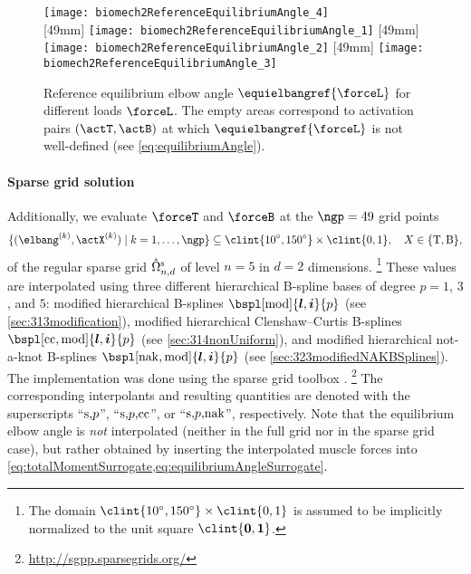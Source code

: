 \begin{figure}
  \texttt{[image: biomech2ReferenceEquilibriumAngle\_4]}%
  \\[2mm]%
  [49mm]{%
    \texttt{[image: biomech2ReferenceEquilibriumAngle\_1]}%
  }%
  \hfill%
  [49mm]{%
    \texttt{[image: biomech2ReferenceEquilibriumAngle\_2]}%
  }%
  \hfill%
  [49mm]{%
    \texttt{[image: biomech2ReferenceEquilibriumAngle\_3]}%
  }%
  \caption[Reference equilibrium elbow angle]{%
    Reference equilibrium elbow angle $\equielbangref{\forceL}$
    for different loads $\forceL$.
    The empty areas correspond to activation pairs $(\actT, \actB)$
    at which $\equielbangref{\forceL}$ is not well-defined
    (see \cref{eq:equilibriumAngle}).%
  }%
  \label{fig:biomech2ReferenceEquilibriumAngle}%
\end{figure}

\paragraph{Sparse grid solution}

Additionally, we evaluate $\forceT$ and $\forceB$ at the $\ngp = 49$
grid points
\begin{equation}
  \{(\elbang^{(k)}, \actX^{(k)}) \mid k = 1, \dotsc, \ngp\}
  \subset \clint{\ang{10}, \ang{150}} \times \clint{0, 1},\quad
  X \in \{\mathrm{T}, \mathrm{B}\},
\end{equation}
of the regular sparse grid $\interiorregsgset{n}{d}$ of
level $n = 5$ in $d = 2$ dimensions.%
\footnote{%
  The domain $\clint{\ang{10}, \ang{150}} \times \clint{0, 1}$
  is assumed to be implicitly normalized to the unit square
  $\clint{\*0, \*1}$.%
}
These values are interpolated using three
different hierarchical B-spline bases of degree $p = 1$, $3$, and $5$:
modified hierarchical B-splines
$\bspl[\modified]{\*l,\*i}{p}$
(see \cref{sec:313modification}),
modified hierarchical Clenshaw--Curtis B-splines
$\bspl[\cc,\modified]{\*l,\*i}{p}$
(see \cref{sec:314nonUniform}), and
modified hierarchical not-a-knot B-splines
$\bspl[\nak,\modified]{\*l,\*i}{p}$
(see \cref{sec:323modifiedNAKBSplines}).
The implementation was done using the sparse grid toolbox
\sgpp{} \cite{Pflueger10Spatially}.%
\footnote{%
  \url{http://sgpp.sparsegrids.org/}%
}
The corresponding interpolants and resulting quantities
are denoted with the superscripts
``$\mathrm{s},\!p$'', ``$\mathrm{s},\!p,\!\mathrm{cc}$'', or ``$\mathrm{s},\!p,\!\mathrm{nak}$'',
respectively.
Note that the equilibrium elbow angle is \emph{not} interpolated
(neither in the full grid nor in the sparse grid case),
but rather obtained by inserting the interpolated muscle forces
into \cref{eq:totalMomentSurrogate,eq:equilibriumAngleSurrogate}.




